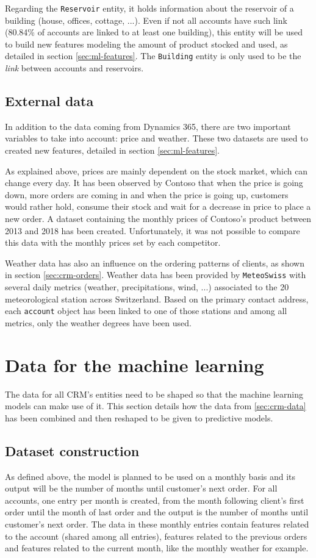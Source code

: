 Regarding the \texttt{Reservoir} entity, it holds information about the reservoir of a building (house, offices, cottage, ...). Even if not all accounts have such link (80.84\% of accounts are linked to at least one building), this entity will be used to build new features modeling the amount of product stocked and used, as detailed in section \ref{sec:ml-features}. The \texttt{Building} entity is only used to be the \textit{link} between accounts and reservoirs.


\subsection{External data}\label{sec:external-data}
In addition to the data coming from Dynamics 365, there are two important variables to take into account: price and weather. These two datasets are used to created new features, detailed in section \ref{sec:ml-features}.

As explained above, prices are mainly dependent on the stock market, which can change every day. It has been observed by Contoso that when the price is going down, more orders are coming in and when the price is going up, customers would rather hold, consume their stock and wait for a decrease in price to place a new order. A dataset containing the monthly prices of Contoso's product between 2013 and 2018 has been created. Unfortunately, it was not possible to compare this data with the monthly prices set by each competitor.

Weather data has also an influence on the ordering patterns of clients, as shown in section \ref{sec:crm-orders}. Weather data has been provided by \texttt{MeteoSwiss} with several daily metrics (weather, precipitations, wind, ...) associated to the 20 meteorological station across Switzerland. Based on the primary contact address, each \texttt{account} object has been linked to one of those stations and among all metrics, only the weather degrees \big[°C\big] have been used.


\section{Data for the machine learning}
The data for all CRM's entities need to be shaped so that the machine learning models can make use of it. This section details how the data from \ref{sec:crm-data} has been combined and then reshaped to be given to predictive models.

\subsection{Dataset construction}\label{sec:data-shape-for-ml}
As defined above, the model is planned to be used on a monthly basis and its output will be the number of months until customer's next order. For all accounts, one entry per month is created, from the month following client's first order until the month of last order and the output is the number of months until customer's next order. The data in these monthly entries contain features related to the account (shared among all entries), features related to the previous orders and features related to the current month, like the monthly weather for example. 

